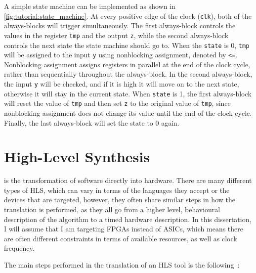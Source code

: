 A simple state machine can be implemented as shown in
\cref{fig:tutorial:state_machine}.  At every positive edge of the clock
(\texttt{clk}), both of the always-blocks will trigger simultaneously.  The
first always-block controls the values in the register \texttt{tmp} and the
output \texttt{z}, while the second always-block controls the next state the
state machine should go to.  When the \texttt{state} is 0, \texttt{tmp} will be
assigned to the input \texttt{y} using nonblocking assignment, denoted by
\texttt{<=}.  Nonblocking assignment assigns registers in parallel at the end of
the clock cycle, rather than sequentially throughout the always-block. In the
second always-block, the input \texttt{y} will be checked, and if it is high it
will move on to the next state, otherwise it will stay in the current state.
When \texttt{state} is 1, the first always-block will reset the value of
\texttt{tmp} and then set \texttt{z} to the original value of \texttt{tmp},
since nonblocking assignment does not change its value until the end of the
clock cycle.  Finally, the last always-block will set the state to 0 again.

\section{High-Level Synthesis}%
\label{sec:bg:hls}

 is the transformation of software directly into hardware.
There are many different types of \gls{HLS}, which can vary in terms of the
languages they accept or the devices that are targeted, however, they often
share similar steps in how the translation is performed, as they all go from a
higher level, behavioural description of the algorithm to a timed hardware
description.  In this dissertation, I will assume that I am targeting
\glspl{FPGA} instead of \glspl{ASIC}, which means there are often different
constraints in terms of available resources, as well as clock frequency.

The main steps performed in the translation of an \gls{HLS} tool is the
following~\cite{coussy09_introd_to_high_level_synth,canis13_l}:

